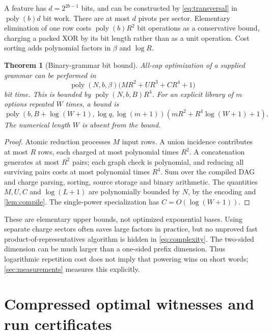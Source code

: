 \documentclass[11pt,a4paper]{article}
\newtheorem{theorem}{Theorem}[section]
\theoremstyle{definition}
\newcommand{\poly}{\operatorname{poly}}
\begin{document}
A feature has $d=2^{2b-1}$ bits, and can be constructed by \eqref{eq:transversal} in $\poly(b)d$ bit work. There are at most $d$ pivots per sector. Elementary elimination of one row costs $\poly(b)R^2$ bit operations as a conservative bound, charging a packed XOR by its bit length rather than as a unit operation. Cost sorting adds polynomial factors in $\beta$ and $\log R$.

\begin{theorem}[Binary-grammar bit bound]\label{thm:complexity}
All-cap optimization of a supplied grammar can be performed in
\begin{equation}
\poly(N,b,\beta)\bigl(MR^2+UR^3+CR^4+1\bigr)
\label{eq:complexity}
\end{equation}
bit time. This is bounded by $\poly(N,b,B)R^4$. For an explicit library of $m$ options repeated $W$ times, a bound is
\begin{equation}
\poly(b,B+\log(W+1),\log q,\log(m+1))
\left(mR^2+R^4\log(W+1)+1\right).
\label{eq:repeatcomplexity}
\end{equation}
The numerical length $W$ is absent from the bound.
\end{theorem}
\begin{proof}
Atomic reduction processes $M$ input rows. A union incidence contributes at most $R$ rows, each charged at most polynomial times $R^2$. A concatenation generates at most $R^2$ pairs; each graph check is polynomial, and reducing all surviving pairs costs at most polynomial times $R^4$. Sum over the compiled DAG and charge parsing, sorting, source storage and binary arithmetic. The quantities $M,U,C$ and $\log(L+1)$ are polynomially bounded by $N$, by the encoding and \cref{lem:compile}. The single-power specialization has $C=O(\log(W+1))$.
\end{proof}

These are elementary upper bounds, not optimized exponential bases. Using separate charge sectors often saves large factors in practice, but no unproved fast product-of-representatives algorithm is hidden in \eqref{eq:complexity}. The two-sided dimension can be much larger than a one-sided prefix dimension. Thus logarithmic repetition cost does not imply that powering wins on short words; \cref{sec:measurements} measures this explicitly.

\section{Compressed optimal witnesses and run certificates}\label{sec:certificates}
\end{document}
